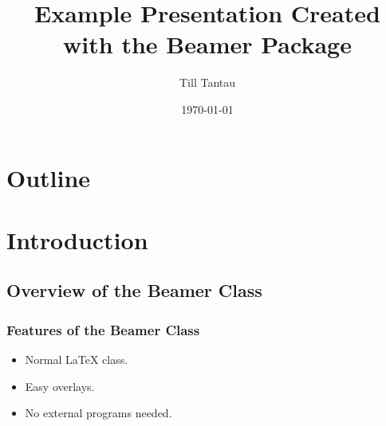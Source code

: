 \documentclass{beamer}
\title{Example Presentation Created with the Beamer Package}
\author{Till Tantau}
\date{\today}
\begin{document}
\frame{\titlepage}
\section*{Outline}
\frame{\tableofcontents}
\section{Introduction}
\subsection{Overview of the Beamer Class}
\frame
{
\frametitle{Features of the Beamer Class}
\begin{itemize}
\item<1-> Normal LaTeX class.
\item<2-> Easy overlays.
\item<3-> No external programs needed.
\end{itemize}
}
\end{document}
